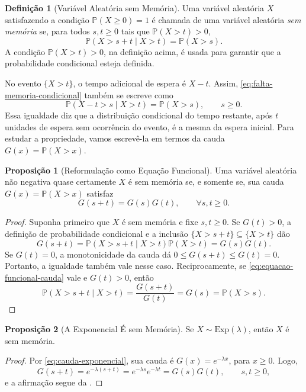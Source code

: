 \documentclass[12pt,portuguese]{article}
\theoremstyle{definition}
\newtheorem{definition}[definition]{Definição}
\newtheorem{proposition}[proposition]{Proposição}
\theoremstyle{plainexercise}
\theoremstyle{starredexercise}
\theoremstyle{definition}
\begin{document}
\begin{definition}[Variável Aleatória sem Memória]\label{def:variavel-sem-memoria}
Uma variável aleatória $X$ satisfazendo a condição $\mathbb{P}(X\geqslant0)=1$ é
chamada de uma variável aleatória \emph{sem memória} se, para todos $s,t\geqslant0$ tais que
$\mathbb{P}(X>t)>0$,
\begin{equation}\label{eq:falta-memoria-condicional}
  \mathbb{P}(X>s+t\mid X>t)=\mathbb{P}(X>s).
\end{equation}
A condição $\mathbb{P}(X>t)>0$, na definição acima, é usada para garantir que a probabilidade condicional
esteja definida.
\end{definition}

No evento $\{X>t\}$, o tempo adicional de espera é $X-t$. Assim,
\eqref{eq:falta-memoria-condicional} também se escreve como
\[
  \mathbb{P}(X-t>s\mid X>t)=\mathbb{P}(X>s),\qquad s\geqslant0.
\]
Essa igualdade diz que a distribuição condicional do tempo restante,
após $t$ unidades de espera sem ocorrência do evento, é a mesma da espera
inicial. Para estudar a propriedade, vamos escrevê-la em termos da cauda
$G(x)=\mathbb{P}(X>x)$.

\begin{proposition}[Reformulação como Equação Funcional]\label{prop:falta-memoria-equacao}
Uma variável aleatória não negativa quase certamente $X$ é sem memória
se, e somente se, sua cauda $G(x)=\mathbb{P}(X>x)$ satisfaz
\begin{equation}\label{eq:equacao-funcional-cauda}
  G(s+t)=G(s)G(t),\qquad\forall s,t\geqslant0.
\end{equation}
\end{proposition}
\begin{proof}
Suponha primeiro que $X$ é sem memória e fixe $s,t\geqslant0$. Se
$G(t)>0$, a definição de probabilidade condicional e a inclusão
$\{X>s+t\}\subseteq\{X>t\}$ dão
\[
  G(s+t)=\mathbb{P}(X>s+t\mid X>t)\mathbb{P}(X>t)=G(s)G(t).
\]
Se $G(t)=0$, a monotonicidade da cauda dá
$0\leqslant G(s+t)\leqslant G(t)=0$. Portanto, a igualdade também vale
nesse caso. Reciprocamente, se \eqref{eq:equacao-funcional-cauda} vale
e $G(t)>0$, então
\[
  \mathbb{P}(X>s+t\mid X>t)=\frac{G(s+t)}{G(t)}=G(s)
  =\mathbb{P}(X>s).
\]
\end{proof}

\begin{proposition}[A Exponencial É sem Memória]\label{prop:exponencial-sem-memoria}
Se $X\sim\mathrm{Exp}(\lambda)$, então $X$ é sem memória.
\end{proposition}
\begin{proof}
Por \eqref{eq:cauda-exponencial}, sua cauda é $G(x)=e^{-\lambda x}$,
para $x\geqslant0$. Logo,
\[
  G(s+t)=e^{-\lambda(s+t)}=e^{-\lambda s}e^{-\lambda t}=G(s)G(t),
  \qquad s,t\geqslant0,
\]
e a afirmação segue da .
\end{proof}
\end{document}
